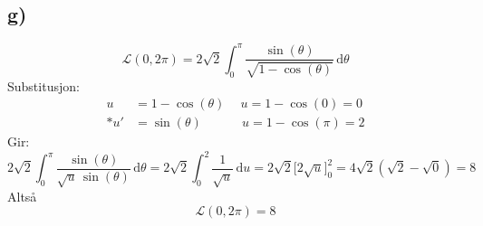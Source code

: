 \documentclass[a4paper, norsk, twoside, 10pt]{article}
\begin{document}
\subsection*{g)}
\[\mathcal{L}(0, 2\pi) = 2\sqrt{2}\int_0^{\pi}\!\frac{\sin(\theta)}{\sqrt{1- \cos(\theta)}}\,\mathrm{d}\theta\]
Substitusjon: \[\begin{split} u &= 1 -\cos(\theta) \quad \: u = 1-\cos(0) = 0\\* u' &= \sin(\theta) \quad \qquad \, u = 1- \cos(\pi) = 2
\end {split}\]
Gir: \[2\sqrt{2}\int_0^{\pi}\!\frac{\sin(\theta)}{\sqrt{u}\,\sin(\theta)}\,\mathrm{d}\theta
= 2\sqrt{2}\int_0^{2}\!\frac{1}{\sqrt{u}}\,\mathrm{d}u
= 2\sqrt{2}\big[2\sqrt{u}\big]_{0}^{2} = 4\sqrt{2}\left(\sqrt{2} -\sqrt{0}\right) = 8\]
Altså \[\mathcal{L}(0,2\pi) = 8\]
\end{document}
